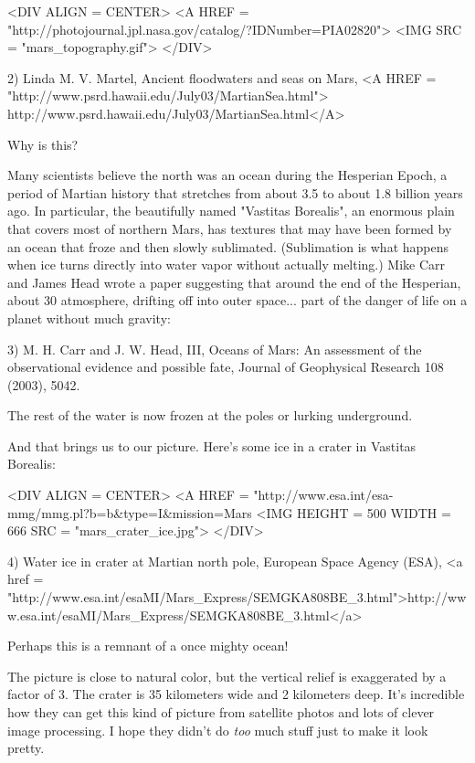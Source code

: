 <DIV ALIGN = CENTER>
<A HREF = "http://photojournal.jpl.nasa.gov/catalog/?IDNumber=PIA02820">
<IMG SRC = "mars_topography.gif">
</DIV>

2) Linda M. V. Martel, Ancient floodwaters and seas on Mars,
<A HREF = "http://www.psrd.hawaii.edu/July03/MartianSea.html">
http://www.psrd.hawaii.edu/July03/MartianSea.html</A>

Why is this?

Many scientists believe the north was an ocean during the Hesperian 
Epoch, a period of Martian history that stretches from about 3.5 to 
about 1.8 billion years ago.   In particular, the beautifully named 
"Vastitas Borealis", an enormous plain that covers most of northern 
Mars, has textures that may have been formed by an ocean that froze 
and then slowly sublimated.  (Sublimation is what happens when ice 
turns directly into water vapor without actually melting.)  
Mike Carr and James Head wrote a paper suggesting that around the end of the 
Hesperian, about 30%
atmosphere, drifting off into outer space... part of the danger of 
life on a planet without much gravity:

3) M. H. Carr and J. W. Head, III, Oceans of Mars: An assessment of 
the observational evidence and possible fate, Journal of Geophysical 
Research 108 (2003), 5042.

The rest of the water is now frozen at the poles or lurking underground.

And that brings us to our picture.  Here's some ice in a crater in 
Vastitas Borealis:

<DIV ALIGN = CENTER>
<A HREF = "http://www.esa.int/esa-mmg/mmg.pl?b=b&type=I&mission=Mars%
<IMG HEIGHT = 500 WIDTH = 666 SRC = "mars_crater_ice.jpg">
</DIV>

4) Water ice in crater at Martian north pole, European Space Agency (ESA), <a href = "http://www.esa.int/esaMI/Mars_Express/SEMGKA808BE_3.html">http://www.esa.int/esaMI/Mars_Express/SEMGKA808BE_3.html</a>

Perhaps this is a remnant of a once mighty ocean!

The picture is close to natural color, but the vertical relief is 
exaggerated by a factor of 3.  The crater is 35 kilometers wide 
and 2 kilometers deep.  It's incredible how they can get this kind
of picture from satellite photos and lots of clever image processing.  
I hope they didn't do \emph{too} much stuff just to make it look pretty.

